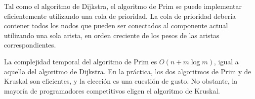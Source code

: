 Tal como el algoritmo de Dijkstra, el algoritmo de Prim se puede
implementar eficientemente utilizando una cola de prioridad. La
cola de prioridad debería contener todos los nodos que pueden
ser conectados al componente actual utilizando una sola arista,
en orden creciente de los pesos de las aristas correspondientes.

La complejidad temporal del algoritmo de Prim es
$O(n + m \log m)$, igual a aquella del algoritmo de Dijkstra.
En la práctica, los dos algoritmos de Prim y de Kruskal son eficientes,
y la elección es una cuestión de gusto. No obstante, la mayoría de
programadores competitivos eligen el algoritmo de Kruskal.